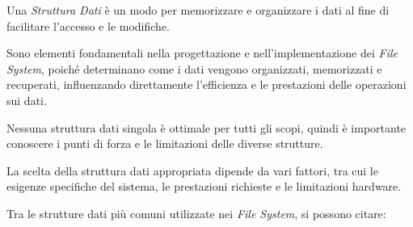 \documentclass[12pt,a4paper,openright,twoside]{book}
\begin{document}
        Una \textit{Struttura Dati} è un modo per memorizzare e organizzare i dati al fine di facilitare l'accesso e le modifiche.

        Sono elementi fondamentali nella progettazione e nell'implementazione dei \textit{File System}, poiché determinano come i dati vengono organizzati, memorizzati e recuperati, influenzando direttamente l'efficienza e le prestazioni delle operazioni sui dati.

        Nessuna struttura dati singola è ottimale per tutti gli scopi, quindi è importante conoscere i punti di forza e le limitazioni delle diverse strutture.

        La scelta della struttura dati appropriata dipende da vari fattori, tra cui le esigenze specifiche del sistema, le prestazioni richieste e le limitazioni hardware.

        Tra le strutture dati più comuni utilizzate nei \textit{File System}, si possono citare:
\end{document}
